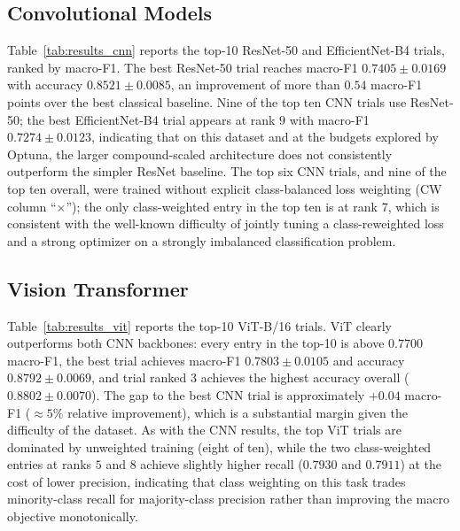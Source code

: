 \documentclass[conference]{IEEEtran}
\begin{document}
\subsection{Convolutional Models}
Table~\ref{tab:results_cnn} reports the top-10 ResNet-50 and EfficientNet-B4 trials, ranked by macro-F1. The best ResNet-50 trial reaches macro-F1 $0.7405 \pm 0.0169$ with accuracy $0.8521 \pm 0.0085$, an improvement of more than $0.54$ macro-F1 points over the best classical baseline. Nine of the top ten CNN trials use ResNet-50; the best EfficientNet-B4 trial appears at rank $9$ with macro-F1 $0.7274 \pm 0.0123$, indicating that on this dataset and at the budgets explored by Optuna, the larger compound-scaled architecture does not consistently outperform the simpler ResNet baseline. The top six CNN trials, and nine of the top ten overall, were trained without explicit class-balanced loss weighting (CW column ``$\times$''); the only class-weighted entry in the top ten is at rank $7$, which is consistent with the well-known difficulty of jointly tuning a class-reweighted loss and a strong optimizer on a strongly imbalanced classification problem.



\subsection{Vision Transformer}
Table~\ref{tab:results_vit} reports the top-10 ViT-B/16 trials. ViT clearly outperforms both CNN backbones: every entry in the top-10 is above $0.7700$ macro-F1, the best trial achieves macro-F1 $0.7803 \pm 0.0105$ and accuracy $0.8792 \pm 0.0069$, and trial ranked $3$ achieves the highest accuracy overall ($0.8802 \pm 0.0070$). The gap to the best CNN trial is approximately $+0.04$ macro-F1 ($\approx 5\%$ relative improvement), which is a substantial margin given the difficulty of the dataset. As with the CNN results, the top ViT trials are dominated by unweighted training (eight of ten), while the two class-weighted entries at ranks $5$ and $8$ achieve slightly higher recall ($0.7930$ and $0.7911$) at the cost of lower precision, indicating that class weighting on this task trades minority-class recall for majority-class precision rather than improving the macro objective monotonically.


\end{document}
